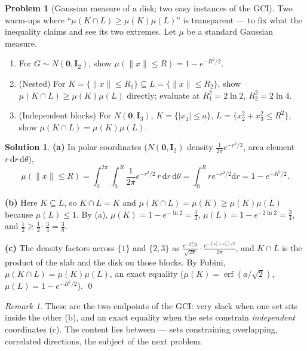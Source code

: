 \documentclass[14pt]{extarticle}
\theoremstyle{definition}
\newtheorem{exercise}{Problem}
\newtheorem*{solution}{Solution}
\theoremstyle{remark}
\newtheorem*{remark}{Remark}
\DeclareMathOperator\erf{erf}
\newcommand{\dd}{\mathrm{d}}
\newcommand{\bI}{\mathbf{I}}
\newcommand{\bzero}{\mathbf{0}}
\newcommand{\norm}[1]{\lVert #1 \rVert}
\begin{document}
\begin{exercise}[Gaussian measure of a disk; two easy instances of the GCI]\label{prob:disk}
Two warm-ups where ``$\mu(K\cap L)\ge\mu(K)\mu(L)$'' is transparent --- to fix what the inequality claims and see its two extremes. Let $\mu$ be a standard Gaussian measure.
\begin{enumerate}[label=(\alph*)]
\item For $G\sim N(\bzero,\bI_2)$, show $\mu(\norm{x}\le R)=1-e^{-R^2/2}$.
\item (Nested) For $K=\{\norm{x}\le R_1\}\subseteq L=\{\norm{x}\le R_2\}$, show $\mu(K\cap L)\ge\mu(K)\mu(L)$ directly; evaluate at $R_1^2=2\ln2$, $R_2^2=2\ln4$.
\item (Independent blocks) For $N(\bzero,\bI_3)$, $K=\{|x_1|\le a\}$, $L=\{x_2^2+x_3^2\le R^2\}$, show $\mu(K\cap L)=\mu(K)\mu(L)$.
\end{enumerate}
\end{exercise}
\begin{solution}
\textbf{(a)} In polar coordinates ($N(\bzero,\bI_2)$ density $\tfrac1{2\pi}e^{-r^2/2}$, area element $r\,\dd r\,\dd\theta$),
\[
\mu(\norm{x}\le R)=\int_0^{2\pi}\!\!\int_0^R\frac1{2\pi}e^{-r^2/2}\,r\,\dd r\,\dd\theta=\int_0^R re^{-r^2/2}\dd r=1-e^{-R^2/2}.
\]

\textbf{(b)} Here $K\subseteq L$, so $K\cap L=K$ and $\mu(K\cap L)=\mu(K)\ge\mu(K)\mu(L)$ because $\mu(L)\le1$. By (a), $\mu(K)=1-e^{-\ln2}=\tfrac12$, $\mu(L)=1-e^{-2\ln2}=\tfrac34$, and $\tfrac12\ge\tfrac12\cdot\tfrac34=\tfrac38$.

\textbf{(c)} The density factors across $\{1\}$ and $\{2,3\}$ as $\tfrac{e^{-x_1^2/2}}{\sqrt{2\pi}}\cdot\tfrac{e^{-(x_2^2+x_3^2)/2}}{2\pi}$, and $K\cap L$ is the product of the slab and the disk on those blocks. By Fubini, $\mu(K\cap L)=\mu(K)\mu(L)$, an exact equality ($\mu(K)=\erf(a/\sqrt2)$, $\mu(L)=1-e^{-R^2/2}$). \qed
\end{solution}
\begin{remark}
These are the two endpoints of the GCI: very slack when one set sits inside the other (b), and an exact equality when the sets constrain \emph{independent} coordinates (c). The content lies between --- sets constraining overlapping, correlated directions, the subject of the next problem.
\end{remark}
\end{document}
